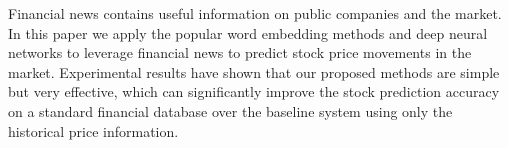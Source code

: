 Financial news contains useful information on public companies and the market. In this paper we apply the popular word embedding methods and deep neural networks to leverage financial news to predict stock price movements in the market. Experimental results have shown that our proposed methods are simple but very effective, which can significantly improve the stock prediction accuracy on a standard financial database over the baseline system using only the historical price information.
